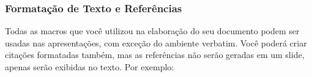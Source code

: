 \begin{frame}

    \frametitle{Formatação de Texto e Referências}
    
    Todas as macros que você utilizou na elaboração do seu documento podem ser usadas nas apresentações, com exceção do ambiente verbatim. Você poderá criar citações formatadas também, mas as referências não serão geradas em um slide, apenas serão exibidas no texto. Por exemplo:
    
    \begin{itemize}
    \end{itemize}
         
\end{frame}